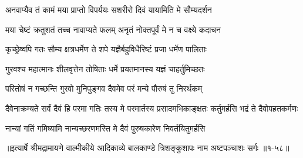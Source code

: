 \twolineshloka
{अनवाप्यैव तं कामं मया प्राप्तो विपर्ययः}
{सशरीरो दिवं यायामिति मे सौम्यदर्शन} %

\twolineshloka
{मया चेष्टं क्रतुशतं तच्च नावाप्यते फलम्}
{अनृतं नोक्तपूर्वं मे न च वक्ष्ये कदाचन} %

\twolineshloka
{कृच्छ्रेष्वपि गतः सौम्य क्षत्रधर्मेण ते शपे}
{यज्ञैर्बहुविधैरिष्टं प्रजा धर्मेण पालिताः} %

\twolineshloka
{गुरवश्च महात्मानः शीलवृत्तेन तोषिताः}
{धर्मे प्रयतमानस्य यज्ञं चाहर्तुमिच्छतः} %

\twolineshloka
{परितोषं न गच्छन्ति गुरवो मुनिपुङ्गव}
{दैवमेव परं मन्ये पौरुषं तु निरर्थकम्} %

\threelineshloka
{दैवेनाक्रम्यते सर्वं दैवं हि परमा गतिः}
{तस्य मे परमार्तस्य प्रसादमभिकाङ्क्षतः}
{कर्तुमर्हसि भद्रं ते दैवोपहतकर्मणः} %

\twolineshloka
{नान्यां गतिं गमिष्यामि नान्यच्छरणमस्ति मे}
{दैवं पुरुषकारेण निवर्तयितुमर्हसि} %


॥इत्यार्षे श्रीमद्रामायणे वाल्मीकीये आदिकाव्ये बालकाण्डे त्रिशङ्कुशापः नाम अष्टपञ्चाशः सर्गः ॥१-५८॥
